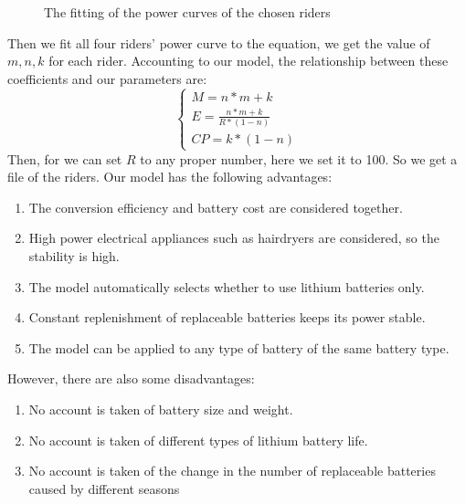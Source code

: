 \documentclass[12pt]{article}
\begin{document}
\begin{figure}[H]
    \centering

    \caption{The fitting of the power curves of the chosen riders}
\end{figure}
Then we fit all four riders' power curve to the equation, we get the value of $m,n,k$ for each rider. Accounting to our model, the relationship between these coefficients
and our parameters are:
\begin{equation}
    \left\{
    \begin{array}{c}
        M=n*m+k                 \\
        E=\frac{n*m+k}{R*(1-n)} \\
        CP=k*(1-n)
    \end{array}
    \right.
\end{equation}
Then, for we can set $R$ to any proper number, here we set it to 100. So we get a file of the riders.%
Our model has the following advantages:
\begin{enumerate}
    \item The conversion efficiency and battery cost are considered together.
    \item High power electrical appliances such as hairdryers are considered, so the stability is high.
    \item The model automatically selects whether to use lithium batteries only.
    \item Constant replenishment of replaceable batteries keeps its power stable.
    \item The model can be applied to any type of battery of the same battery type.
\end{enumerate}
However, there are also some disadvantages:
\begin{enumerate}
    \item No account is taken of battery size and weight.
    \item No account is taken of different types of lithium battery life.
    \item No account is taken of the change in the number of replaceable batteries caused by different seasons
\end{enumerate}
\end{document}
